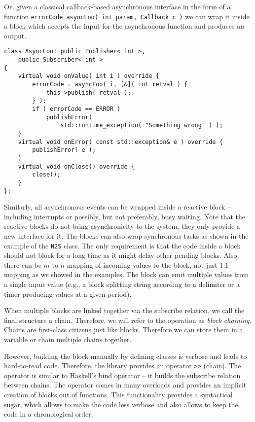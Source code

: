 Or, given a classical callback-based asynchronous interface in the form of a
function \texttt{errorCode asyncFoo( int param, Callback c
)} we can wrap it inside a block which accepts the input for the asynchronous
function and produces an output.
\begin{verbatim}
class AsyncFoo: public Publisher< int >,
    public Subscriber< int >
{
    virtual void onValue( int i ) override {
        errorCode = asyncFoo( i, [&]( int retval ) {
            this->publish( retval );
        } );
        if ( errorCode == ERROR )
            publishError(
                std::runtime_exception( "Something wrong" ) );
    }
    virtual void onError( const std::exception& e ) override {
        publishError( e );
    }
    virtual void onClose() override {
        close();
    }
};
\end{verbatim}

Similarly, all asynchronous events can be wrapped inside a reactive block --
including interrupts or possibly, but not preferably, busy waiting. Note that
the reactive blocks do not bring asynchronicity to the system, they only
provide a new interface for it. The blocks can also wrap synchronous tasks as
shown in the example of the \texttt{N2S} class. The only requirement is that the
code inside a block should not block for a long time as it might delay other
pending blocks. Also, there can be $m$-to-$n$ mapping of incoming values to the
block, not just 1:1 mapping as we showed in the examples. The block can emit
multiple values from a single input value (e.g., a block splitting string
according to a delimiter or a timer producing values at a given period).

When multiple blocks are linked together via the subscribe relation, we call the
final structure a chain. Therefore, we will refer to the operation as
\emph{block chaining}. Chains are first-class citizens just like blocks.
Therefore we can store them in a variable or chain multiple chains together.

However, building the block manually by defining classes is verbose and leads to
hard-to-read code. Therefore, the library provides an operator
\texttt{>>} (chain). The operator is similar to Haskell's
bind operator -- it builds the subscribe relation between chains. The operator
comes in many overloads and provides an implicit creation of blocks out of
functions. This functionality provides a syntactical sugar, which allows to make
the code less verbose and also allows to keep the code in a chronological order.

